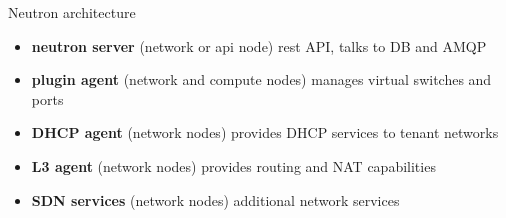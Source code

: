 \documentclass[english,serif,mathserif,xcolor=pdftex,dvipsnames,table]{beamer}
\begin{document}

\begin{frame}
  {Neutron architecture}
  \begin{itemize}
  \item \textbf{neutron server} (network or api node) rest API, talks to DB and AMQP
  \item \textbf{plugin agent} (network and compute nodes) manages virtual
    switches and ports
  \item \textbf{DHCP agent} (network nodes) provides DHCP services to tenant networks
  \item \textbf{L3 agent} (network nodes) provides routing and NAT capabilities
  \item \textbf{SDN services} (network nodes) additional network services
  \end{itemize}
\end{frame}

%
%
%
%
%
%
%
%
%
\end{document}

